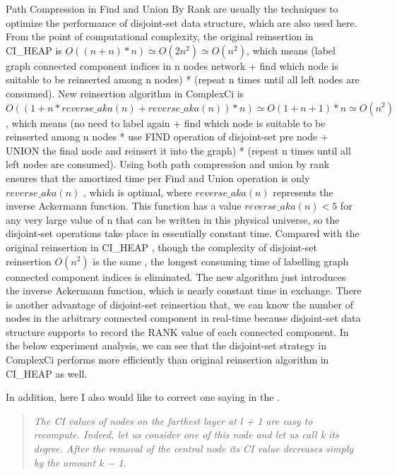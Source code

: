 \documentclass{article}
\newenvironment{itquote}
{\begin{quote}\itshape}
	{\end{quote}\ignorespacesafterend}
\begin{document}
\begin{enumerate}
\begin{item}
		Path Compression in Find and Union By Rank are usually the techniques to optimize the performance of disjoint-set data structure\cite{wikiDisjointsetdatastructure}, which are also used here. 
		From the point of computational complexity, the original reinsertion in CI\_HEAP is $O((n+n)*n) \simeq O(2n^2) \simeq O(n^2)$, which means (label graph connected component indices in n nodes network + find which node is suitable to be reinserted among n nodes) * (repeat n times until all left nodes are consumed). New reinsertion algorithm in ComplexCi is $O((1+n*reverse\_aka(n)+reverse\_aka(n)) *n) \simeq O(1+n+1)*n \simeq O(n^2)$ , which means (no need to label again + find which node is suitable to be reinserted among n nodes * use FIND operation of disjoint-set pre node + UNION the final node and reinsert it into the graph) * (repeat n times until all left nodes are consumed). Using both path compression and union by rank ensures that the amortized time per Find and Union operation is only $reverse\_aka(n)$ \cite{tarjan1979class}\cite{tarjan1984worst} , which is optimal, where $reverse\_aka(n)$ represents the inverse Ackermann function. This function has a value $reverse\_aka(n)<5$ for any very large value of n that can be written in this physical universe, so the disjoint-set operations take place in essentially constant time\cite{wikiDisjointsetdatastructure}. Compared with the original reinsertion in CI\_HEAP , though the complexity of disjoint-set reinsertion $O(n^2)$ is the same , the longest consuming time of labelling graph connected component indices is eliminated. The new algorithm just introduces the inverse Ackermann function, which is nearly constant time in exchange. There is another advantage of disjoint-set reinsertion that, we can know the number of nodes in the arbitrary connected component in real-time because disjoint-set data structure supports to record the RANK value of each connected component. In the below experiment analysis, we can see that the disjoint-set strategy in ComplexCi performs more efficiently than original reinsertion algorithm in CI\_HEAP as well.


	\end{item}
	\end{enumerate}	

	
	In addition, here I also would like to correct one saying in the \cite{morone2016collective}. 
	
	\begin{itquote}
		The CI values of nodes on the farthest layer at l + 1 are easy to recompute. Indeed, let us consider one of this node and let us call k its degree. After the removal of the central node its CI value decreases simply by the amount k − 1.
	\end{itquote}
\end{document}
